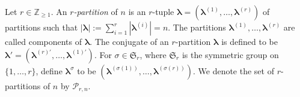 \documentclass[a4paper,10pt]{amsart}
\theoremstyle{plain}
\newcommand{\lam}{\lambda}
\def\Z{{\mathbb Z}}
\def\blam{{\boldsymbol \lambda}}
\theoremstyle{plain}
\numberwithin{equation}{section}
\begin{document}

Let $r\in\Z_{\geq 1}$. An {\em $r$-partition} of $n$ is an $r$-tuple $\blam=(\blam^{(1)}, \dots, \blam^{(r)})$ of partitions such that $|\blam|:=\sum_{i=1}^r|\blam^{(i)}|=n$. The partitions $\blam^{(1)}, \dots,
\blam^{(r)}$ are called components of $\blam$. The conjugate of an $r$-partition $\blam$ is defined to be $\blam'=(\blam^{(r)'}, \dots, \blam^{(1)'})$. For $\sigma\in\mathfrak{S}_r$, where $\mathfrak{S}_r$ is the symmetric group on $\{1, \dots, r\}$, define $\blam^\sigma$ to be $(\blam^{(\sigma(1))}, \dots, \blam^{(\sigma(r))})$.
We denote the set of $r$-partitions of $n$ by $\mathscr{P}_{r,n}$.
\end{document}
